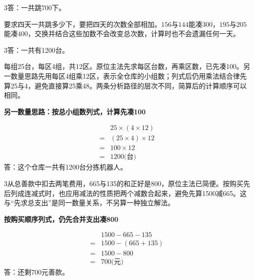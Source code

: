 \documentclass[multi=snippet,border={5bp 20bp 5bp 5bp}]{standalone}
\newenvironment{snippet}[3]{\begin{minipage}{#1bp}\color{answerred}\fontsize{#2}{#3}\selectfont\raggedright}{\end{minipage}}
\begin{document}
\begin{snippet}{505}{11.5}{14}\begin{multicols}{3}\raggedcolumns 答：一共跳700下。\par 要求四天一共跳多少下，要把四天的次数全部相加。\(156\)\allowbreak 与\(144\)\allowbreak 能凑\(300\)\allowbreak ，\(195\)\allowbreak 与\(205\)\allowbreak 能凑\(400\)\allowbreak ，交换并结合这些加数不会改变总次数，计算时也不会遗漏任何一天。\end{multicols}\end{snippet}
\begin{snippet}{505}{11.5}{14}\begin{multicols}{3}\raggedcolumns 答：一共有1200台。\par 每组25台，每区4组，共12区。原位主法先求每区台数，再乘区数，已先凑100。另一数量思路先用每区4组乘12区，表示全仓库的小组数；列式后仍用乘法结合律先算25与4，避免直接算25乘48。两条分析路径的层次不同，简算后的计算顺序可以相同。\par \textbf{另一数量思路：按总小组数列式，计算先凑100}\par \[\begin{aligned}&25\times(4\times12)\\={}&(25\times4)\times12\\={}&100\times12\\={}&1200\text{(台)}\end{aligned}\]答：这个仓库一共有1200台分拣机器人。\end{multicols}\end{snippet}
\begin{snippet}{505}{11.5}{14}\begin{multicols}{3}\raggedcolumns 从总善款中扣去两笔费用，665与135的和正好是800，原位主法已简便。按购买先后列成连减式时，也应用减法的性质把两个减数合起来，避免先算1500减665。这与“先求总支出”是同一数量关系，不另算一种独立解法。\par \textbf{按购买顺序列式，仍先合并支出凑800}\par \[\begin{aligned}&1500-665-135\\={}&1500-(665+135)\\={}&1500-800\\={}&700\text{(元)}\end{aligned}\]答：还剩700元善款。\end{multicols}\end{snippet}
\end{document}
